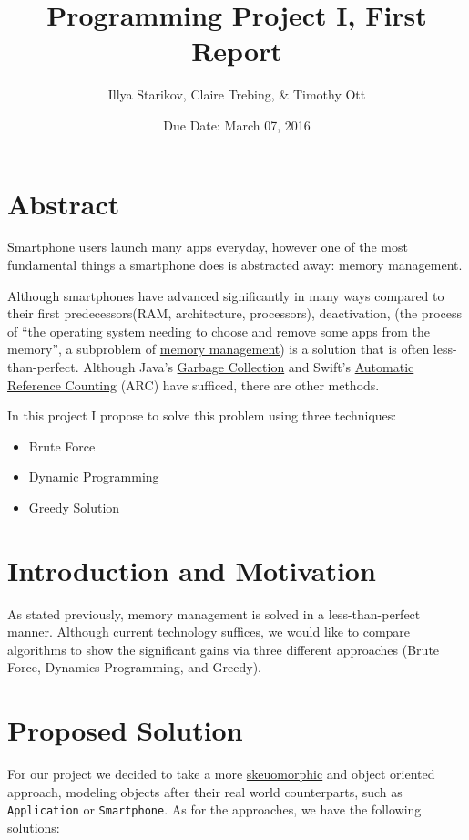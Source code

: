 \documentclass{article}
\title{Programming Project I, First Report}
\author{Illya Starikov, Claire Trebing, \& Timothy Ott}
\date{Due Date: March 07, 2016}
\begin{document}
\maketitle

\section{Abstract}
Smartphone users launch many apps everyday, however one of the most fundamental things a smartphone does is abstracted away: memory management.

Although smartphones have advanced significantly in many ways compared to their first predecessors(RAM, architecture, processors), deactivation, (the process of ``the operating system needing to choose and remove some apps from the memory'', a subproblem of \href{https://en.wikipedia.org/wiki/Memory_management}{memory management}) is a solution that is often less-than-perfect. Although Java's \href{http://www.oracle.com/webfolder/technetwork/tutorials/obe/java/gc01/index.html}{Garbage Collection} and Swift's \href{https://developer.apple.com/library/ios/documentation/Swift/Conceptual/Swift_Programming_Language/AutomaticReferenceCounting.html}{Automatic Reference Counting} (ARC) have sufficed, there are other methods.

In this project I propose to solve this problem using three techniques:

\begin{itemize}
    \item Brute Force
    \item Dynamic Programming
    \item Greedy Solution
\end{itemize}

\section{Introduction and Motivation}
As stated previously, memory management is solved in a less-than-perfect manner. Although current technology suffices, we would like to compare algorithms to show the significant gains via three different approaches (Brute Force, Dynamics Programming, and Greedy).

\section{Proposed Solution}
For our project we decided to take a more \href{https://en.wikipedia.org/wiki/Skeuomorph}{skeuomorphic} and object oriented approach, modeling objects after their real world counterparts, such as \texttt{Application} or \texttt{Smartphone}. As for the approaches, we have the following solutions:
\end{document}
